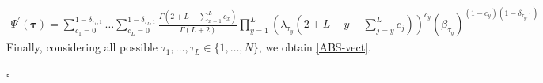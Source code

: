 \documentclass[11pt]{article}
\numberwithin{equation}{section}
\numberwithin{equation}{subsection}
\begin{document}
\begin{equation}\label{elementsABS}
	\begin{split}
		\Psi^{'}(\bm{\tau})=\sum_{c_{1}=0}^{1-\delta_{\tau_{1},1}}\ldots\sum_{c_{L}=0}^{1-\delta_{\tau_{L},1}}\frac{\Gamma(2+L-\sum_{x=1}^{L}c_{x})}{\Gamma(L+2)}\prod_{y=1}^{L}\left(\lambda_{\tau_{y}}\left(2+L-y-\sum_{j=y}^{L}c_{j}\right)\right)^{c_{y}}\left(\beta_{\tau_{y}}\right)^{(1-c_{y})(1-\delta_{\tau_{y},1})}
	\end{split}
\end{equation} 
Finally, considering all possible $\tau_{1},\ldots,\tau_{L}\in \{1,\ldots,N\}$, we obtain \eqref{ABS-vect}.
\begin{flushright}
    $\square$
\end{flushright}
\end{document}
